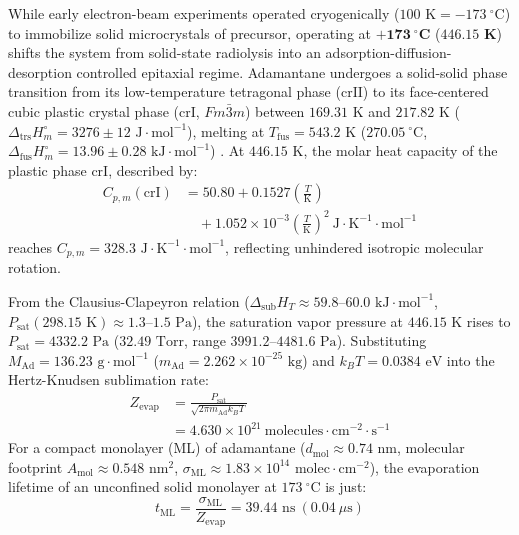 \documentclass[10pt,twocolumn,a4paper]{article}
\begin{document}
While early electron-beam experiments operated cryogenically ($100\text{ K} = -173\ ^\circ\text{C}$) \cite{Fu2025} to immobilize solid microcrystals of precursor, operating at $\mathbf{+173\ ^\circ\text{C}}$ ($\mathbf{446.15\text{ K}}$) shifts the system from solid-state radiolysis into an adsorption-diffusion-desorption controlled epitaxial regime. Adamantane undergoes a solid-solid phase transition from its low-temperature tetragonal phase ($\text{crII}$) to its face-centered cubic plastic crystal phase ($\text{crI}$, $Fm\bar{3}m$) between $169.31\text{ K}$ and $217.82\text{ K}$ ($\Delta_{\text{trs}}H^\circ_m = 3276 \pm 12\text{ J}\cdot\text{mol}^{-1}$), melting at $T_{\text{fus}} = 543.2\text{ K}$ ($270.05\ ^\circ\text{C}$, $\Delta_{\text{fus}}H^\circ_m = 13.96 \pm 0.28\text{ kJ}\cdot\text{mol}^{-1}$) \cite{Bazyleva2011}. At $446.15\text{ K}$, the molar heat capacity of the plastic phase $\text{crI}$, described by:
\begin{equation}
\begin{split}
C_{p,m}(\text{crI}) &= 50.80 + 0.1527\left(\frac{T}{\text{K}}\right) \\
&\quad + 1.052 \times 10^{-3}\left(\frac{T}{\text{K}}\right)^2\ \text{J}\cdot\text{K}^{-1}\cdot\text{mol}^{-1}
\end{split}
\end{equation}
reaches $C_{p,m} = 328.3\text{ J}\cdot\text{K}^{-1}\cdot\text{mol}^{-1}$, reflecting unhindered isotropic molecular rotation.

From the Clausius-Clapeyron relation ($\Delta_{\text{sub}}H_T \approx 59.8\text{--}60.0\text{ kJ}\cdot\text{mol}^{-1}$, $P_{\text{sat}}(298.15\text{ K}) \approx 1.3\text{--}1.5\text{ Pa}$), the saturation vapor pressure at $446.15\text{ K}$ rises to $P_{\text{sat}} = 4332.2\text{ Pa}$ ($32.49\text{ Torr}$, range $3991.2\text{--}4481.6\text{ Pa}$). Substituting $M_{\text{Ad}} = 136.23\text{ g}\cdot\text{mol}^{-1}$ ($m_{\text{Ad}} = 2.262 \times 10^{-25}\text{ kg}$) and $k_B T = 0.0384\text{ eV}$ into the Hertz-Knudsen sublimation rate:
\begin{equation}
\begin{split}
Z_{\text{evap}} &= \frac{P_{\text{sat}}}{\sqrt{2\pi m_{\text{Ad}} k_B T}} \\
&= 4.630 \times 10^{21}\ \text{molecules}\cdot\text{cm}^{-2}\cdot\text{s}^{-1}
\end{split}
\end{equation}
For a compact monolayer (ML) of adamantane ($d_{\text{mol}} \approx 0.74\text{ nm}$, molecular footprint $A_{\text{mol}} \approx 0.548\text{ nm}^2$, $\sigma_{\text{ML}} \approx 1.83 \times 10^{14}\text{ molec}\cdot\text{cm}^{-2}$), the evaporation lifetime of an unconfined solid monolayer at $173\ ^\circ\text{C}$ is just:
\begin{equation}
t_{\text{ML}} = \frac{\sigma_{\text{ML}}}{Z_{\text{evap}}} = 39.44\text{ ns}\ (0.04\ \mu\text{s})
\end{equation}
\end{document}
